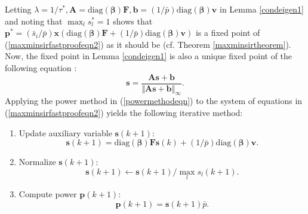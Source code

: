 \documentclass[10pt,twocolumn]{IEEEtran}
\newcommand{\0}{\mathbf{0}}
\newcommand{\1}{\mathbf{1}}
\begin{document}
Letting $\lambda = 1/\tau^{\ast}, \mathbf{A}= \mbox{diag}(\boldsymbol{\beta}) \mathbf{F}, \mathbf{b}=(1/\bar{p}) \mbox{diag}(\boldsymbol{\beta}) \mathbf{v}$ in Lemma \ref{condeigen1} and noting that $\max_l s_l^{\ast}=1$ shows that $\mathbf{p}^{\ast}=(\bar{s}_i/\bar{p})\mathbf{x}(\mbox{diag}(\boldsymbol{\beta})\mathbf{F}+(1/\bar{p})\mbox{diag}(\boldsymbol{\beta})\mathbf{v})$ is a fixed point of (\ref{maxminsirfastproofeqn2}) as it should be (cf. Theorem \ref{maxminsirtheorem}). Now, the fixed point in Lemma \ref{condeigen1} is also a unique fixed point of the following equation \cite{Blondel05}:
\begin{equation}
\label{powermethodeqn}
\mathbf{s} = \frac{\mathbf{A}\mathbf{s}+\mathbf{b}}{\Vert \mathbf{A}\mathbf{s}+\mathbf{b} \Vert_{\infty}}.
\end{equation}
Applying the power method in (\ref{powermethodeqn}) to the system of equations in (\ref{maxminsirfastproofeqn2}) yields the following iterative method:
\begin{enumerate}
\item \label{maxminsirfaststep1} Update auxiliary variable $\mathbf{s}(k+1)$: 
\begin{equation}
\mathbf{s}(k+1)= \mbox{diag}(\boldsymbol{\beta})\mathbf{F} \mathbf{s}(k) + (1/\bar{p})\mbox{diag}(\boldsymbol{\beta})\mathbf{v}.
\end{equation}
\item \label{maxminsirfaststep2} Normalize $\mathbf{s}(k+1)$: 
\begin{equation}
\mathbf{s}(k+1) \leftarrow \mathbf{s}(k+1)/\max_l s_l(k+1).
\end{equation}
\item \label{maxminsirfaststep3} Compute power $\mathbf{p}(k+1)$: 
\begin{equation}
\mathbf{p}(k+1)=\mathbf{s}(k+1) \bar{p}.
\end{equation}
\end{enumerate}
\end{document}
